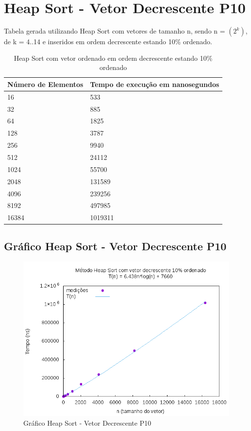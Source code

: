 \documentclass[12pt,a4paper,twoside]{report}
\begin{document}
\section{Heap Sort - Vetor Decrescente P10}
Tabela gerada utilizando Heap Sort com vetores de tamanho n, sendo n = $(2^k)$, de k = 4..14 e inseridos em ordem decrescente estando 10\% ordenado.
\begin{table}[H]
\centering
\caption{Heap Sort com vetor ordenado em ordem decrescente estando 10\% ordenado}
\label{my-label}
\begin{tabular}{|l|l|}
\hline
\multicolumn{1}{|c|}{\textbf{Número de Elementos}} & \multicolumn{1}{c|}{\textbf{Tempo de execução em nanosegundos}} \\ \hline
16 & 533 \\ \hline
32 & 885 \\ \hline
64 & 1825 \\ \hline
128 & 3787 \\ \hline
256 & 9940 \\ \hline
512 & 24112 \\ \hline
1024 & 55700 \\ \hline
2048 & 131589 \\ \hline
4096 & 239256 \\ \hline
8192 & 497985 \\ \hline
16384 & 1019311 \\ \hline
\end{tabular}
\end{table}

\subsection{Gráfico Heap Sort - Vetor Decrescente P10}
\begin{figure}[H]
    \centering
    \includegraphics[width=0.7\linewidth]{graficos/HeapSort/vIntDecrescenteP10/vIntDecrescenteP10.png}
  \caption{Gráfico Heap Sort - Vetor Decrescente P10}
\end{figure}
\end{document}
